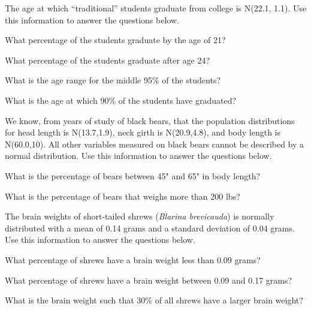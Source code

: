 \documentclass[10pt,openany]{book}\usepackage[]{graphicx}\usepackage[]{color}
\begin{document}
\newpage
\begin{exsection}
  \item \label{revex:quNormStudentAge} The age at which ``traditional'' students graduate from college is N(22.1, 1.1).  Use this information to answer the questions below. 
\begin{Enumerate}
  \item What percentage of the students graduate by the age of 21?
  \item What percentage of the students graduate after age 24?
  \item What is the age range for the middle 95\% of the students?
  \item What is the age at which 90\% of the students have graduated?
\end{Enumerate}

  \item \label{revex:quNormBlackBears} We know, from years of study of black bears, that the population distributions for head length is N(13.7,1.9), neck girth is N(20.9,4.8), and body length is N(60.0,10). All other variables measured on black bears cannot be described by a normal distribution.  Use this information to answer the questions below. 
\begin{Enumerate}
  \item What is the percentage of bears between 45" and 65" in body length?
  \item What is the percentage of bears that weighs more than 200 lbs?
\end{Enumerate}

  \item \label{revex:quNormShrews} The brain weights of short-tailed shrews (\textit{Blarina brevicauda}) is normally distributed with a mean of 0.14 grams and a standard deviation of 0.04 grams. Use this information to answer the questions below. 
\begin{Enumerate}
  \item What percentage of shrews have a brain weight less than 0.09 grams?
  \item What percentage of shrews have a brain weight between 0.09 and 0.17 grams?
  \item What is the brain weight such that 30\% of all shrews have a larger brain weight?
\end{Enumerate}


\end{exsection}
\end{document}
